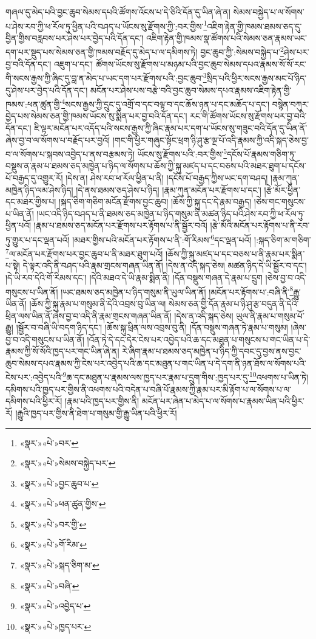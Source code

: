 གཞལ་དུ་མེད་པའི་བྱང་ཆུབ་སེམས་དཔའི་ཚོགས་འོངས་པ་དེ་ཅིའི་དོན་དུ་ཡིན་ཞེ་ན། སེམས་བསྐྱེད་པ་ལ་སོགས་པ་ཤེས་རབ་ཀྱི་ཕ་རོལ་ཏུ་ཕྱིན་པའི་བཤད་པ་ཡོངས་སུ་རྫོགས་ཀྱི་:བར་གྱིས་\footnote{«སྣར་»«པེ་»བར་}འཇིག་རྟེན་གྱི་ཁམས་ཐམས་ཅད་དུ་བྱིན་གྱིས་བརླབས་པར་ཤེས་པར་བྱེད་པའི་དོན་དང་། འཇིག་རྟེན་གྱི་ཁམས་སྣ་ཚོགས་པའི་སེམས་ཅན་རྣམས་ཡང་དག་པར་སྡུད་པས་སེམས་ཅན་གྱི་ཁམས་བརྗོད་དུ་མེད་པ་ལ་དམིགས་ཏེ། བྱང་ཆུབ་ཀྱི་:སེམས་བསྐྱེད་པ་\footnote{«སྣར་»«པེ་»སེམས་བསྐྱེད་པར་}ཤེས་པར་བྱ་བའི་དོན་དང་། འཇུག་པ་དང་། ཚོགས་ཡོངས་སུ་རྫོགས་པ་མཉམ་པའི་བྱང་ཆུབ་སེམས་དཔའ་རྣམས་སོ་སོ་རང་གི་སངས་རྒྱས་ཀྱི་ཞིང་དུ་བླ་ན་མེད་པ་ཡང་དག་པར་རྫོགས་པའི་:བྱང་ཆུབ་\footnote{«སྣར་»«པེ་»བྱང་ཆུབ་པ་}སྲིད་པའི་ཕྱིར་སངས་རྒྱས་མང་པོ་ཉིད་དུ་ཤེས་པར་བྱེད་པའི་དོན་དང་། མངོན་པར་ཤེས་པས་བརྩེ་བའི་བྱང་ཆུབ་སེམས་དཔའ་རྣམས་འཇིག་རྟེན་གྱི་ཁམས་:ཕན་ཚུན་གྱི་\footnote{«སྣར་»«པེ་»ཕན་ཚུན་གྱིས་}སངས་རྒྱས་ཀྱི་དྲུང་དུ་འགྲོ་བ་དང་བལྟ་བ་དང་ཆོས་ཉན་པ་དང་མཆོད་པ་དང་། བསྙེན་བཀུར་བྱེད་པས་སེམས་ཅན་གྱི་ཁམས་ཡོངས་སུ་སྨིན་པར་བྱ་བའི་དོན་དང་། རང་གི་ཚོགས་ཡོངས་སུ་རྫོགས་པར་བྱ་བའི་དོན་དང་། ཇི་ལྟར་མངོན་པར་འདོད་པའི་སངས་རྒྱས་ཀྱི་ཞིང་རྣམ་པར་དག་པ་ཡོངས་སུ་གཟུང་བའི་དོན་དུ་ཡིན་ནོ་ཞེས་བྱ་བ་ལ་སོགས་པ་བརྗོད་པར་བྱའོ། །གང་གི་ཕྱིར་གཞུང་སྟོང་ཕྲག་ཉི་ཤུ་རྩ་ལྔ་པོ་འདི་རྣམས་ཀྱི་འདི་སྐད་ཅེས་བྱ་བ་ལ་སོགས་པ་སྐབས་འབྱེད་པ་ནས་བརྩམས་ཏེ། ཡོངས་སུ་རྫོགས་པའི་:བར་གྱིས་\footnote{«སྣར་»«པེ་»བར་གྱི་}དངོས་པོ་རྣམས་གཅིག་ཏུ་བསྡུས་ན་རྣམ་པ་ཐམས་ཅད་མཁྱེན་པ་ཉིད་ལ་སོགས་པ་ཆོས་ཀྱི་སྐུ་མཛད་པ་དང་བཅས་པའི་མཐར་ཐུག་པ་དངོས་པོ་བརྒྱད་དུ་འགྱུར་རོ། །དེས་ན། ཤེས་རབ་ཕ་རོལ་ཕྱིན་པ་ནི། །དངོས་པོ་བརྒྱད་ཀྱིས་ཡང་དག་བཤད། །རྣམ་ཀུན་མཁྱེན་ཉིད་ལམ་ཤེས་ཉིད། །དེ་ནས་ཐམས་ཅད་ཤེས་པ་ཉིད། །རྣམ་ཀུན་མངོན་པར་རྫོགས་པ་དང་། །རྩེ་མོར་ཕྱིན་དང་མཐར་གྱིས་པ། །སྐད་ཅིག་གཅིག་མངོན་རྫོགས་བྱང་ཆུབ། །ཆོས་ཀྱི་སྐུ་དང་དེ་རྣམ་བརྒྱད། །ཅེས་གང་གསུངས་པ་ཡིན་ནོ། །ཡང་འདི་ཉིད་བཤད་པ་ནི་ཐམས་ཅད་མཁྱེན་པ་ཉིད་གསུམ་ནི་མཚན་ཉིད་པའི་ཤེས་རབ་ཀྱི་ཕ་རོལ་ཏུ་ཕྱིན་པའོ། །རྣམ་པ་ཐམས་ཅད་མངོན་པར་རྫོགས་པར་རྟོགས་པ་ནི་སྦྱོར་བའོ། །རྩེ་མོའི་མངོན་པར་རྟོགས་པ་ནི་རབ་ཏུ་གྱུར་པ་དང་ལྡན་པའོ། །མཐར་གྱིས་པའི་མངོན་པར་རྟོགས་པ་ནི་:གོ་རིམས་\footnote{«སྣར་»«པེ་»གོ་རིམ་}དང་ལྡན་པའོ། །:སྐད་ཅིག་མ་གཅིག་\footnote{«སྣར་»«པེ་»སྐད་ཅིག་མ་}ལ་མངོན་པར་རྫོགས་པར་བྱང་ཆུབ་པ་ནི་མཐར་ཐུག་པའོ། །ཆོས་ཀྱི་སྐུ་མཛད་པ་དང་བཅས་པ་ནི་རྣམ་པར་སྨིན་པ་སྟེ། དེ་ལྟར་འདི་ནི་བཤད་པའི་རྣམ་གྲངས་གཞན་ཡིན་ནོ། །དེས་ན་འདི་སྐད་ཅེས། མཚན་ཉིད་དེ་ཡི་སྦྱོར་བ་དང་། །དེ་ཡི་རབ་དེའི་གོ་རིམས་དང་། །དེའི་མཐའ་དེ་ཡི་རྣམ་སྨིན་ནི། །དོན་བསྡུས་གཞན་དེ་རྣམ་པ་དྲུག །ཅེས་བྱ་བ་འདི་གསུངས་པ་ཡིན་ནོ། །ཡང་ཐམས་ཅད་མཁྱེན་པ་ཉིད་གསུམ་ནི་ཡུལ་ཡིན་ནོ། །མངོན་པར་རྟོགས་པ་:བཞི་ནི་\footnote{«སྣར་»«པེ་»བཞི་}རྒྱུ་ཡིན་ནོ། །ཆོས་ཀྱི་སྐུ་རྣམ་པ་གསུམ་ནི་དེའི་འབྲས་བུ་ཡིན་ལ། སེམས་ཅན་གྱི་དོན་རྣམ་པ་ཉི་ཤུ་རྩ་བདུན་ནི་དེའི་ཕྲིན་ལས་ཡིན་ནོ་ཞེས་བྱ་བ་འདི་ནི་རྣམ་གྲངས་གཞན་ཡིན་ནོ། །དེས་ན་འདི་སྐད་ཅེས། ཡུལ་ནི་རྣམ་པ་གསུམ་པོ་རྒྱུ། །སྦྱོར་བ་བཞི་ཡི་བདག་ཉིད་དང་། །ཆོས་སྐུ་ཕྲིན་ལས་འབྲས་བུ་ནི། །དོན་བསྡུས་གཞན་ཏེ་རྣམ་པ་གསུམ། །ཞེས་བྱ་བ་འདི་གསུངས་པ་ཡིན་ནོ། །འོན་ཏེ་དེ་དང་དེར་ངེས་པར་འབྱེད་པའི་ཆ་དང་མཐུན་པ་གསུངས་པ་གང་ཡིན་པ་དེ་རྣམས་ཀྱི་སོ་སོའི་ཁྱད་པར་གང་ཡིན་ཞེ་ན། རེ་ཞིག་རྣམ་པ་ཐམས་ཅད་མཁྱེན་པ་ཉིད་ཀྱི་དབང་དུ་བྱས་ནས་བྱང་ཆུབ་སེམས་དཔའ་རྣམས་ཀྱི་ངེས་པར་འབྱེད་པའི་ཆ་དང་མཐུན་པ་གང་ཡིན་པ་དེ་དག་ནི་ཉན་ཐོས་ལ་སོགས་པའི་ངེས་པར་:འབྱེད་པའི་\footnote{«སྣར་»«པེ་»འབྱེད་པ་}ཆ་དང་མཐུན་པ་རྣམས་ལས་ཁྱད་པར་རྣམ་པ་དྲུག་གིས་:ཁྱད་པར་དུ་\footnote{«སྣར་»«པེ་»ཁྱད་པར་}འཕགས་པ་ཡིན་ཏེ། དམིགས་པའི་ཁྱད་པར་གྱིས་ནི་འཕགས་པའི་བདེན་པ་བཞི་པོ་རྣམས་ཀྱི་རྣམ་པར་མི་རྟོག་པ་ལ་སོགས་པ་ལ་དམིགས་པའི་ཕྱིར་རོ། །རྣམ་པའི་ཁྱད་པར་གྱིས་ནི། མངོན་པར་ཞེན་པ་མེད་པ་ལ་སོགས་པ་རྣམས་ཡིན་པའི་ཕྱིར་རོ། །རྒྱུའི་ཁྱད་པར་གྱིས་ནི་ཐེག་པ་གསུམ་གྱི་རྒྱུ་ཡིན་པའི་ཕྱིར་རོ། 